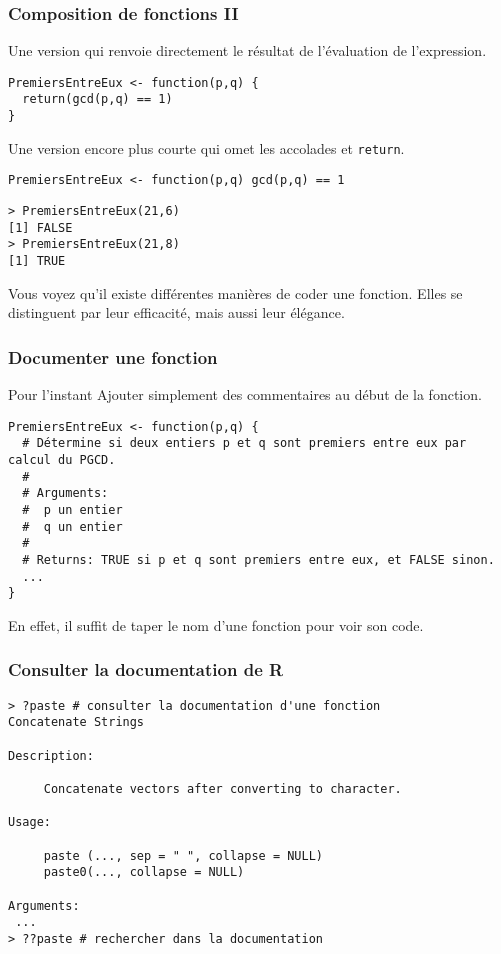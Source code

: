 \documentclass[10pt]{beamer}
\begin{document}
\begin{frame}[fragile]
  \frametitle{Composition de fonctions II}
 
Une version qui renvoie directement le résultat de l'évaluation de l'expression.
\begin{lstlisting}[style=editor]
PremiersEntreEux <- function(p,q) {
  return(gcd(p,q) == 1)
}  
\end{lstlisting}

Une version encore plus courte qui omet les accolades et \texttt{return}.
\begin{lstlisting}[style=editor]
PremiersEntreEux <- function(p,q) gcd(p,q) == 1
\end{lstlisting}

\begin{lstlisting}
> PremiersEntreEux(21,6)
[1] FALSE
> PremiersEntreEux(21,8)
[1] TRUE  
\end{lstlisting}

Vous voyez qu'il existe différentes manières de coder une fonction.
Elles se distinguent par leur \alert{efficacité}, mais aussi leur \alert{élégance}.


\end{frame}


\begin{frame}[fragile]
  \frametitle{Documenter une fonction}
  \begin{block}{Pour l'instant}
    Ajouter simplement des commentaires au début de la fonction.    
  \end{block}

\begin{lstlisting}
PremiersEntreEux <- function(p,q) {
  # Détermine si deux entiers p et q sont premiers entre eux par calcul du PGCD.
  #
  # Arguments:
  #  p un entier
  #  q un entier
  #
  # Returns: TRUE si p et q sont premiers entre eux, et FALSE sinon.
  ...
}
\end{lstlisting}
En effet, il suffit de \alert{taper le nom d’une fonction pour voir son code}.
\end{frame}

\begin{frame}[fragile]
  \frametitle{Consulter la documentation de R}

  \begin{lstlisting}
> ?paste # consulter la documentation d'une fonction
Concatenate Strings

Description:

     Concatenate vectors after converting to character.

Usage:

     paste (..., sep = " ", collapse = NULL)
     paste0(..., collapse = NULL)
     
Arguments:
 ...    
> ??paste # rechercher dans la documentation
  \end{lstlisting}
\end{frame}  
\end{document}
